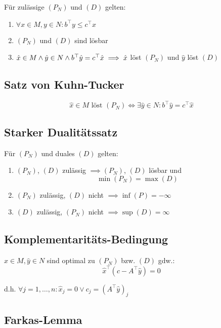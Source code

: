 Für zulässige \((P_N)\) und \((D)\) gelten:

\begin{enumerate}[label=(\alph*)]
	\item \(\forall x \in M, y \in N : b^\top y \leq c^\top x\)
	\item \((P_N)\) und \((D)\) sind lösbar
	\item \(\hat x \in M \land \hat y \in N \land b^\top \hat y = c^\top \hat x \\ \implies \hat x\) löst \((P_N)\) und \(\hat y\) löst \((D)\)
\end{enumerate}

\subsection*{Satz von Kuhn-Tucker}

\[\hat x \in M \text{ löst } (P_N) \iff \exists \hat y \in N : b^\top \hat y = c^\top \hat x\]

\subsection*{Starker Dualitätssatz}

Für \((P_N)\) und duales \((D)\) gelten:

\begin{enumerate}[label=(\alph*)]
	\item \((P_N)\), \((D)\) zulässig \(\implies (P_N)\), \((D)\) lösbar und \[\min (P_N) = \max (D)\]
	\item \((P_N)\) zulässig, \((D)\) nicht \(\implies \inf (P) = -\infty\)
	\item \((D)\) zulässig, \((P_N)\) nicht \(\implies \sup (D) = \infty\)
\end{enumerate}

\subsection*{Komplementaritäts-Bedingung}

\(\hat x \in M, \hat y \in N\) sind optimal zu \((P_N)\) bzw. \((D)\) gdw.:
\[\hat x^\top (c-A^\top \hat y) = 0\]

d.h. \(\forall j = 1,\dots,n : \hat x_j = 0 \lor c_j = (A^\top \hat y)_j\)

\subsection*{Farkas-Lemma}

